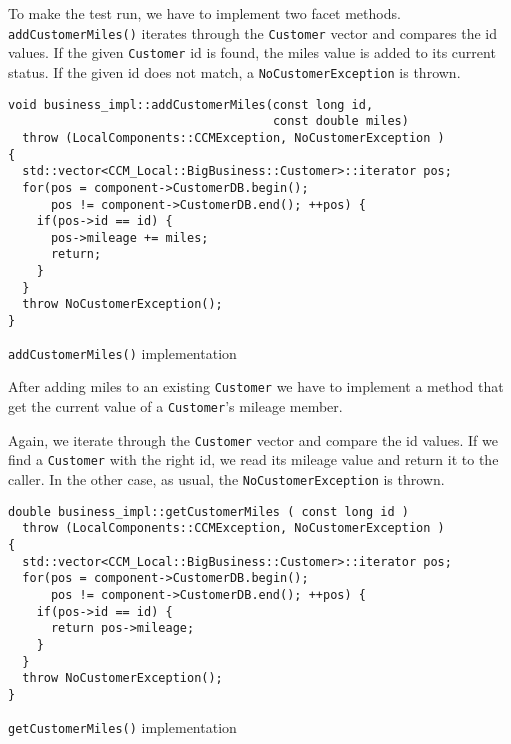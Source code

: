 To make the test run, we have to implement two facet methods.
{\tt addCustomerMiles()} iterates through the {\tt Customer} vector
and compares the id values.
If the given {\tt Customer} id is found, the miles value is added to
its current status.
If the given id does not match, a {\tt NoCustomerException} is thrown.
\begin{Example}
\begin{minifbox}
\begin{small}
\begin{verbatim}
void business_impl::addCustomerMiles(const long id, 
                                     const double miles)
  throw (LocalComponents::CCMException, NoCustomerException )
{
  std::vector<CCM_Local::BigBusiness::Customer>::iterator pos;
  for(pos = component->CustomerDB.begin(); 
      pos != component->CustomerDB.end(); ++pos) {
    if(pos->id == id) {
      pos->mileage += miles;
      return;
    }
  }
  throw NoCustomerException();    
}
\end{verbatim}
\end{small}
\end{minifbox}
\caption{{\tt addCustomerMiles()} implementation}
\label{example:}
\end{Example}

After adding miles to an existing {\tt Customer} we have to implement a method
that get the current value of a {\tt Customer}'s mileage member.

Again, we iterate through the {\tt Customer} vector and compare the id values.
If we find a {\tt Customer} with the right id, we read its mileage value and
return it to the caller.
In the other case, as usual, the {\tt NoCustomerException} is thrown.

\begin{Example}
\begin{minifbox}
\begin{small}
\begin{verbatim}
double business_impl::getCustomerMiles ( const long id )
  throw (LocalComponents::CCMException, NoCustomerException )
{
  std::vector<CCM_Local::BigBusiness::Customer>::iterator pos;
  for(pos = component->CustomerDB.begin(); 
      pos != component->CustomerDB.end(); ++pos) {
    if(pos->id == id) {
      return pos->mileage;
    }
  }
  throw NoCustomerException(); 
}
\end{verbatim}
\end{small}
\end{minifbox}
\caption{{\tt getCustomerMiles()} implementation}
\label{example:}
\end{Example}


